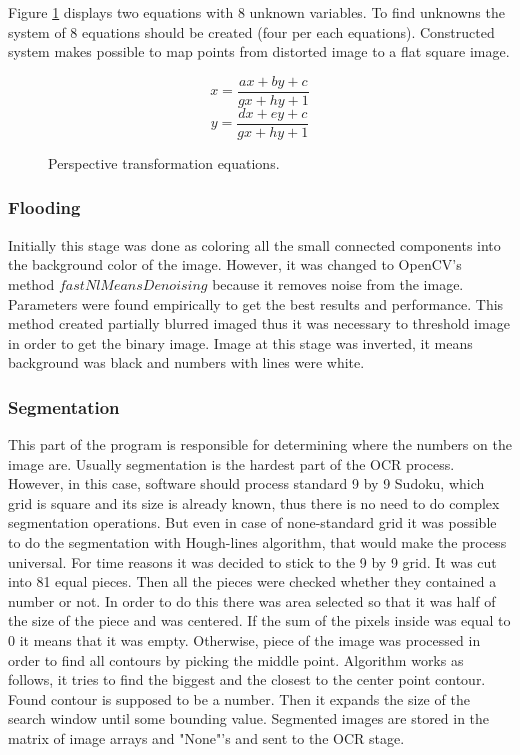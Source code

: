 \documentclass[../../main]{subfiles}
\begin{document}
Figure \ref{eq:persptransform} displays two equations with 8 unknown variables. To find unknowns the system of 8 equations should be created (four per each equations). Constructed system makes possible to map points from distorted image to a flat square image.

\begin{figure} [!ht]
  \centering    
    \begin{equation}
        x = \frac{ax+by+c}{gx+hy+1}
    \end{equation}
     \begin{equation}
        y = \frac{dx+ey+c}{gx+hy+1}
    \end{equation}
  \caption{Perspective transformation equations.}
  \label{eq:persptransform}
\end{figure}

\subsubsection{Flooding}

Initially this stage was done as coloring all the small connected components into the background color of the image. However, it was changed to \ac{OpenCV}'s method $fastNlMeansDenoising$ because it removes noise from the image. Parameters were found empirically to get the best results and performance. This method created partially blurred imaged thus it was necessary to threshold image in order to get the binary image. Image at this stage was inverted, it means background was black and numbers with lines were white.

\subsubsection{Segmentation}

This part of the program is responsible for determining where the numbers on the image are. Usually segmentation is the hardest part of the OCR process. However, in this case, software should process standard 9 by 9 Sudoku, which grid is square and its size is already known, thus there is no need to do complex segmentation operations. But even in case of none-standard grid it was possible to do the segmentation with Hough-lines algorithm, that would make the process universal. For time reasons it was decided to stick to the 9 by 9 grid. It was cut into 81 equal pieces. Then all the pieces were checked whether they contained a number or not. In order to do this there was area selected so that it was half of the size of the piece and was centered. If the sum of the pixels inside was equal to 0 it means that it was empty. Otherwise, piece of the image was processed in order to find all contours by picking the middle point. Algorithm works as follows, it tries to find the biggest and the closest to the center point contour. Found contour is supposed to be a number. Then it expands the size of the search window until some bounding value. Segmented images are stored in the matrix of image arrays and "None"'s and sent to the OCR stage.
\end{document}
